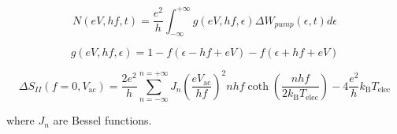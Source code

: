 \begin{equation}
N\left(eV,hf,t\right) = \frac{e^{2}}{h}\int_{-\infty}^{+\infty}g\left(eV,hf,\epsilon\right)\Delta W_{pump}\left(\epsilon,t\right)d\epsilon
\end{equation}

\begin{equation}
g\left(eV,hf,\epsilon\right) = 1-f\left(\epsilon-hf+eV\right)-f\left(\epsilon+hf+eV\right)
\end{equation}

\begin{equation}
\Delta S_{II}\left(f = 0, V_{\mathrm{ac}}\right) = \frac{2e^{2}}{h}\sum_{n = -\infty}^{n = +\infty} J_{n}\left(\frac{eV_{\mathrm{ac}}}{hf}\right)^{2}nhf\coth\left(\frac{nhf}{2k_{\mathrm{B}}T_{\mathrm{elec}}}\right)-4\frac{e^{2}}{h}k_{\mathrm{B}}T_{\mathrm{elec}} \label{eq: LF noise vs pump amp}
\end{equation}

where $J_{n}$ are Bessel functions.


%	

%	


